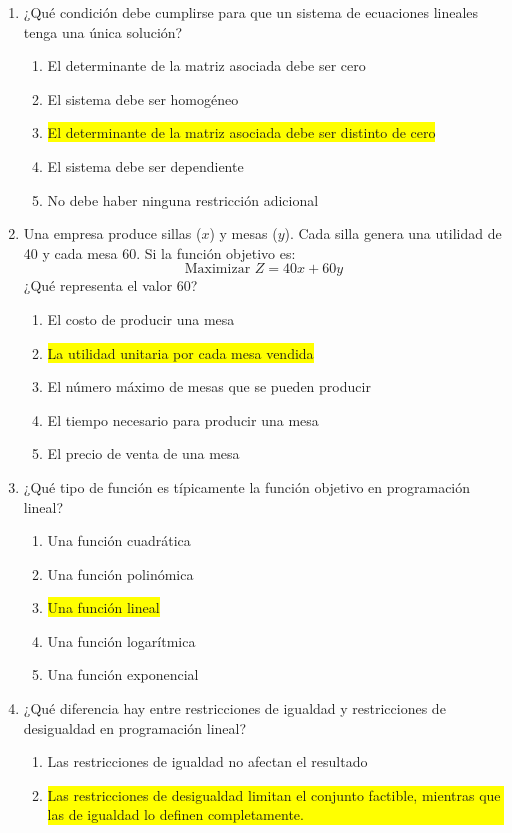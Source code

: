 \documentclass{article}
\begin{document}
\begin{enumerate}
\item ¿Qué condición debe cumplirse para que un sistema de ecuaciones lineales tenga una única solución?
\begin{enumerate}
\item El determinante de la matriz asociada debe ser cero
\item El sistema debe ser homogéneo
\item \colorbox{yellow}{El determinante de la matriz asociada debe ser distinto de cero}
\item El sistema debe ser dependiente
\item No debe haber ninguna restricción adicional
\end{enumerate}

\item Una empresa produce sillas ($x$) y mesas ($y$). Cada silla genera una utilidad de 40 y cada mesa 60. Si la función objetivo es:
\[
\text{Maximizar } Z = 40x + 60y
\]
¿Qué representa el valor 60?
\begin{enumerate}
\item El costo de producir una mesa
\item \colorbox{yellow}{La utilidad unitaria por cada mesa vendida}
\item El número máximo de mesas que se pueden producir
\item El tiempo necesario para producir una mesa
\item El precio de venta de una mesa
\end{enumerate}

\item ¿Qué tipo de función es típicamente la función objetivo en programación lineal?
\begin{enumerate}
\item Una función cuadrática
\item Una función polinómica
\item \colorbox{yellow}{Una función lineal}
\item Una función logarítmica
\item Una función exponencial
\end{enumerate}

\item ¿Qué diferencia hay entre restricciones de igualdad y restricciones de desigualdad en programación lineal?
\begin{enumerate}
\item Las restricciones de igualdad no afectan el resultado
\item \colorbox{yellow}{\parbox{\linewidth}{Las restricciones de desigualdad limitan el conjunto factible, mientras que las de igualdad lo definen completamente.}}


\end{enumerate}
\end{enumerate}
\end{document}
